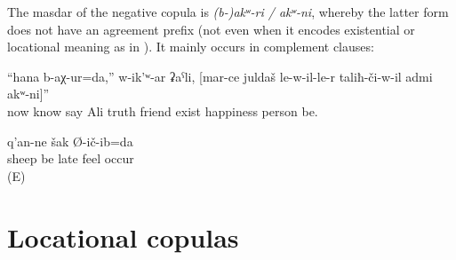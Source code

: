 The masdar of the negative copula is \textit{{(b-)akʷ-ri / akʷ-ni}}, whereby the latter form does not have an agreement prefix (not even when it encodes existential or locational meaning as in ). It mainly occurs in complement clauses:
%
\begin{exe}
	\ex	\label{ex:Now I know, says Ali, that there is no happy man than the one who has a true friend}
	\gll	``hana	b-aχ-ur=da,''	w-ik'ʷ-ar	ʡaˁli,	[mar-ce	juldaš	le-w-il-le-r	taliħ-či-w-il	admi	akʷ-ni]''\\
		now	know	say	Ali	truth	friend	exist	happiness	person	be.\\
	\glt	{}

	\ex	\label{ex:I guessed late that my sheep were not there}
		q'an-ne	šak	Ø-ič-ib=da\\
			sheep	be	late	feel	occur\\
	\glt	{} (E)
\end{exe}



\section{Locational copulas}
\label{sec:Locational copulae}

